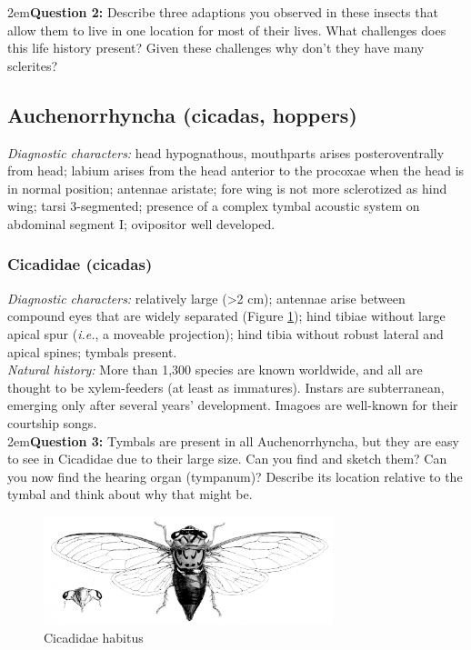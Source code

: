 \documentclass[letterpaper, 11pt]{article}
\begin{document}
\hangindent2em\textbf{Question 2:} Describe three adaptions you observed in these insects that allow them to live in one location for most of their lives. What challenges does this life history present? Given these challenges why don't they have many sclerites?\\

\subsection{Auchenorrhyncha (cicadas, hoppers)}
\noindent{}\textit{Diagnostic characters:} head hypognathous, mouthparts arises posteroventrally from head; labium arises from the head anterior to the procoxae when the head is in normal position; antennae aristate; fore wing is not more sclerotized as hind wing; tarsi 3-segmented; presence of a complex tymbal acoustic system on abdominal segment I; ovipositor well developed.\\

\subsubsection{Cicadidae (cicadas)}
\noindent{}\textit{Diagnostic characters:} relatively large (\textgreater{}2 cm); antennae arise between compound eyes that are widely separated (Figure \ref{fig:cicadidae}); hind tibiae without large apical spur (\textit{i.e.}, a moveable projection); hind tibia without robust lateral and apical spines; tymbals present.\\

\noindent{}\textit{Natural history:} More than 1,300 species are known worldwide, and all are thought to be xylem-feeders (at least as immatures). Instars are subterranean, emerging only after several years' development. Imagoes are well-known for their courtship songs. \\

\hangindent2em\textbf{Question 3:} Tymbals are present in all Auchenorrhyncha, but they are easy to see in Cicadidae due to their large size. Can you find and sketch them? Can you now find the hearing organ (tympanum)? Describe its location relative to the tymbal and think about why that might be.\\

\begin{figure}[ht!]
 \centering
 \includegraphics[width=0.75\textwidth]{CicadidHabitus}
 \caption{Cicadidae habitus \citep[][Plate 100]{bhl33187}}
 \label{fig:cicadidae}
\end{figure}
\end{document}
